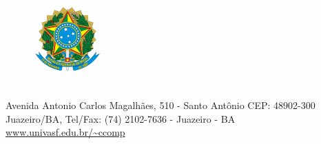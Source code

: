 \documentclass[
	12pt,				%
	openany,			%
	oneside, 			%
	a4paper,			%
	chapter=TITLE,		%
	section=TITLE,		%
	sumario=tradicional,	
	english,			%
	brazil,				%
	inline,             %
	shortlabels,        %
	hyphens             %
	]{abntex2}
\begin{document}
	\frenchspacing %
    
    \setlength{\belowcaptionskip}{0pt}
    \setlength{\abovecaptionskip}{0pt}
    \setlength{\intextsep}{-18pt}

    \begin{figure}[h]
        \begin{center}
            \includegraphics[scale=0.8]{img/brasao_brasil_m.png}
        \end{center}
    \end{figure}
    \center
    {\textbf{\ABNTEXchapterfont\imprimirinstituicao}}
    \\
    Avenida Antonio Carlos Magalhães, 510 - Santo Antônio CEP: 48902-300 \\
    Juazeiro/BA, Tel/Fax: (74) 2102-7636 - Juazeiro - BA \\
    \url{www.univasf.edu.br/~ccomp}
    
    \begin{mdframed}[roundcorner=10pt]
        \begin{minipage}[t][3\height][c]{\dimexpr\textwidth-1\fboxsep-2\fboxrule\relax}
            \centering
            \ABNTEXchapterfont\large\imprimirtipotrabalho
        \end{minipage}
    \end{mdframed}
    
\end{document}
